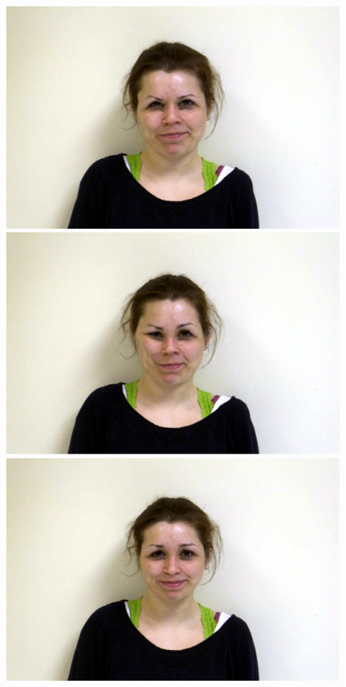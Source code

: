 \documentclass[11pt]{article}
\begin{document}
\begin{figure}[H]
\begin{center}
\includegraphics[scale=0.17]{figs/caricatures/fun_08.jpg}  
\includegraphics[scale=0.17]{figs/caricatures/fun_09.jpg}  
\includegraphics[scale=0.17]{figs/caricatures/fun_10.jpg} 

\end{center}
\end{figure}
\end{document}
